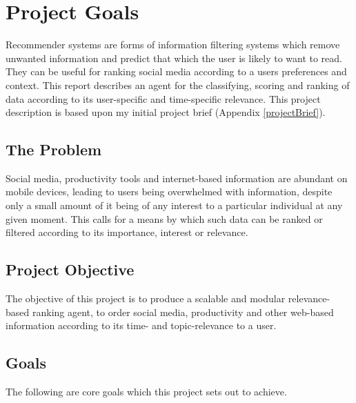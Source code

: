 \chapter{Project Goals}

Recommender systems are forms of information filtering systems which remove unwanted information and predict that which the user is likely to want to read. They can be useful for ranking social media according to a users preferences and context. This report describes an agent for the classifying, scoring and ranking of data according to its user-specific and time-specific relevance. This project description is based upon my initial project brief (Appendix \ref{projectBrief}).

\section{The Problem}

Social media, productivity tools and internet-based information are abundant on mobile devices, leading to users being overwhelmed with information, despite only a small amount of it being of any interest to a particular individual at any given moment. This calls for a means by which such data can be ranked or filtered according to its importance, interest or relevance.

\section{Project Objective}

The objective of this project is to produce a scalable and modular relevance-based ranking agent, to order social media, productivity and other web-based information according to its time- and topic-relevance to a user.

\section{Goals}

The following are core goals which this project sets out to achieve.

